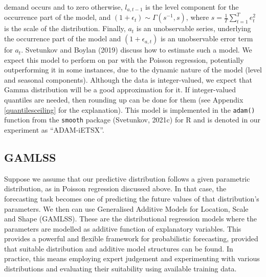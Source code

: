 \documentclass[]{elsarticle} %
\begin{document}
demand occurs and to zero otherwise, \(l_{a,t-1}\) is the level component
for the occurrence part of the model, and
\(\left(1+\epsilon_t \right) \sim \Gamma(s^{-1}, s)\), where
\(s=\frac{1}{T} \sum_{t=1}^{T} e_{t}^2\) is the scale of the distribution.
Finally, \(a_t\) is an unobservable series, underlying the occurrence part
of the model and \((1 + \epsilon_{a,t})\) is an unobservable error term
for \(a_t\). Svetunkov and Boylan (2019) discuss how to estimate such a model. We
expect this model to perform on par with the Poisson regression,
potentially outperforming it in some instances, due to the dynamic
nature of the model (level and seasonal components). Although the data
is integer-valued, we expect that Gamma distribution will be a good
approximation for it. If integer-valued quantiles are needed, then
rounding up can be done for them (see Appendix \ref{quantilesceiling}
for the explanation). This model is implemented in the \texttt{adam()} function
from the \texttt{smooth} package (Svetunkov, 2021c) for R and is denoted in
our experiment as ``ADAM-iETSX''.

\hypertarget{gamlss}{%
\subsection{GAMLSS}\label{gamlss}}

Suppose we assume that our predictive distribution follows a given
parametric distribution, as in Poisson regression discussed above. In
that case, the forecasting task becomes one of predicting the future
values of that distribution's parameters. We then can use Generalised
Additive Models for Location, Scale and Shape (GAMLSS). These are the
distributional regression models where the parameters are modelled as
additive function of explanatory variables. This provides a powerful
and flexible framework for probabilistic forecasting, provided that
suitable distribution and additive model structures can be found. In
practice, this means employing expert judgement and experimenting with
various distributions and evaluating their suitability using available
training data.
\end{document}
